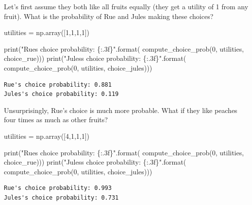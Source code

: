 \documentclass[
  letterpaper,
  DIV=11,
  numbers=noendperiod]{scrreprt}
\newenvironment{Shaded}{\begin{snugshade}}{\end{snugshade}}
\newcommand{\BuiltInTok}[1]{\textcolor[rgb]{0.00,0.23,0.31}{#1}}
\newcommand{\DecValTok}[1]{\textcolor[rgb]{0.68,0.00,0.00}{#1}}
\newcommand{\NormalTok}[1]{\textcolor[rgb]{0.00,0.23,0.31}{#1}}
\newcommand{\OperatorTok}[1]{\textcolor[rgb]{0.37,0.37,0.37}{#1}}
\newcommand{\SpecialCharTok}[1]{\textcolor[rgb]{0.37,0.37,0.37}{#1}}
\newcommand{\StringTok}[1]{\textcolor[rgb]{0.13,0.47,0.30}{#1}}
\begin{document}
Let's first assume they both like all fruits equally (they get a utility
of 1 from any fruit). What is the probability of Rue and Jules making
these choices?

\begin{Shaded}
\begin{Highlighting}[]
\NormalTok{utilities }\OperatorTok{=}\NormalTok{ np.array([}\DecValTok{1}\NormalTok{,}\DecValTok{1}\NormalTok{,}\DecValTok{1}\NormalTok{,}\DecValTok{1}\NormalTok{])}

\BuiltInTok{print}\NormalTok{(}\StringTok{"Rue\textquotesingle{}s choice probability: }\SpecialCharTok{\{:.3f\}}\StringTok{"}\NormalTok{.}\BuiltInTok{format}\NormalTok{(}
\NormalTok{  compute\_choice\_prob(}\DecValTok{0}\NormalTok{, utilities, choice\_rue)))}
\BuiltInTok{print}\NormalTok{(}\StringTok{"Jules\textquotesingle{}s choice probability: }\SpecialCharTok{\{:.3f\}}\StringTok{"}\NormalTok{.}\BuiltInTok{format}\NormalTok{(}
\NormalTok{  compute\_choice\_prob(}\DecValTok{0}\NormalTok{, utilities, choice\_jules)))}
\end{Highlighting}
\end{Shaded}

\begin{verbatim}
Rue's choice probability: 0.881
Jules's choice probability: 0.119
\end{verbatim}

Unsurprisingly, Rue's choice is much more probable. What if they like
peaches four times as much as other fruits?

\begin{Shaded}
\begin{Highlighting}[]
\NormalTok{utilities }\OperatorTok{=}\NormalTok{ np.array([}\DecValTok{4}\NormalTok{,}\DecValTok{1}\NormalTok{,}\DecValTok{1}\NormalTok{,}\DecValTok{1}\NormalTok{])}

\BuiltInTok{print}\NormalTok{(}\StringTok{"Rue\textquotesingle{}s choice probability: }\SpecialCharTok{\{:.3f\}}\StringTok{"}\NormalTok{.}\BuiltInTok{format}\NormalTok{(}
\NormalTok{  compute\_choice\_prob(}\DecValTok{0}\NormalTok{, utilities, choice\_rue)))}
\BuiltInTok{print}\NormalTok{(}\StringTok{"Jules\textquotesingle{}s choice probability: }\SpecialCharTok{\{:.3f\}}\StringTok{"}\NormalTok{.}\BuiltInTok{format}\NormalTok{(}
\NormalTok{  compute\_choice\_prob(}\DecValTok{0}\NormalTok{, utilities, choice\_jules)))}
\end{Highlighting}
\end{Shaded}

\begin{verbatim}
Rue's choice probability: 0.993
Jules's choice probability: 0.731
\end{verbatim}
\end{document}
